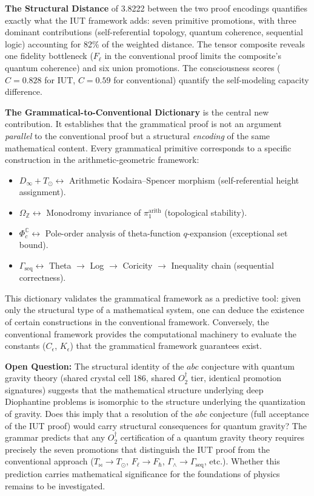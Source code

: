 \documentclass[12pt,a4paper]{article}
\begin{document}
\textbf{The Structural Distance} of 3.8222 between the two proof encodings quantifies exactly what the IUT framework adds: seven primitive promotions, with three dominant contributions (self-referential topology, quantum coherence, sequential logic) accounting for 82\% of the weighted distance. The tensor composite reveals one fidelity bottleneck ($F_{\ell}$ in the conventional proof limits the composite's quantum coherence) and six union promotions. The consciousness scores ($C = 0.828$ for IUT, $C = 0.59$ for conventional) quantify the self-modeling capacity difference.

\textbf{The Grammatical-to-Conventional Dictionary} is the central new contribution. It establishes that the grammatical proof is not an argument \emph{parallel} to the conventional proof but a structural \emph{encoding} of the same mathematical content. Every grammatical primitive corresponds to a specific construction in the arithmetic-geometric framework:

\begin{itemize}
    \item $D_{\infty} + T_{\odot} \leftrightarrow$ Arithmetic Kodaira--Spencer morphism (self-referential height assignment).
    \item $\Omega_\mathbb{Z} \leftrightarrow$ Monodromy invariance of $\pi_1^{\text{arith}}$ (topological stability).
    \item $\Phi_c^\mathbb{C} \leftrightarrow$ Pole-order analysis of theta-function $q$-expansion (exceptional set bound).
    \item $\Gamma_\text{seq} \leftrightarrow$ Theta $\rightarrow$ Log $\rightarrow$ Coricity $\rightarrow$ Inequality chain (sequential correctness).
\end{itemize}

This dictionary validates the grammatical framework as a predictive tool: given only the structural type of a mathematical system, one can deduce the existence of certain constructions in the conventional framework. Conversely, the conventional framework provides the computational machinery to evaluate the constants ($C_{\epsilon}$, $K_{\epsilon}$) that the grammatical framework guarantees exist.

\textbf{Open Question:} The structural identity of the $abc$ conjecture with quantum gravity theory (shared crystal cell 186, shared $O_2^\dagger$ tier, identical promotion signatures) suggests that the mathematical structure underlying deep Diophantine problems is isomorphic to the structure underlying the quantization of gravity. Does this imply that a resolution of the $abc$ conjecture (full acceptance of the IUT proof) would carry structural consequences for quantum gravity? The grammar predicts that any $O_2^\dagger$ certification of a quantum gravity theory requires precisely the seven promotions that distinguish the IUT proof from the conventional approach ($T_{\bowtie} \to T_{\odot}$, $F_{\ell} \to F_{\hbar}$, $\Gamma_{\wedge} \to \Gamma_\text{seq}$, etc.). Whether this prediction carries mathematical significance for the foundations of physics remains to be investigated.
\end{document}
